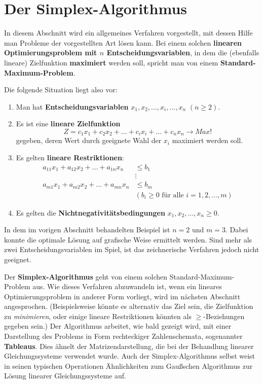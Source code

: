 \section{Der Simplex-Algorithmus}


In diesem Abschnitt wird ein allgemeines Verfahren vorgestellt, mit dessen Hilfe man Probleme der vorgestellten Art lösen kann. Bei einem solchen \textbf{linearen Optimierungsproblem mit $n$ Entscheidungsvariablen}, in dem die (ebenfalls lineare) Zielfunktion \textbf{maximiert} werden soll, spricht man von einem \textbf{Standard-Maximum-Problem}.

Die folgende Situation liegt also vor:
\begin{enumerate}[label=\Roman*)]
  \item Man hat \textbf{Entscheidungsvariablen} $x_1, x_2, \ldots, x_i, \ldots, x_n$ $(n \geq 2)$.
  \item Es ist eine \textbf{lineare Zielfunktion}
    \[ Z = c_1 x_1 + c_2 x_2 + \ldots + c_i x_i + \ldots + c_n x_n \rightarrow Max! \]
    gegeben, deren Wert durch geeignete Wahl der $x_i$ maximiert werden soll.
  \item Es gelten \textbf{lineare Restriktionen}:
    \begin{align*}
      a_{11} x_1 + a_{12} x_2 + \ldots + a_{1n} x_n &\leq b_1\\
      &\vdots\\
      a_{m1} x_1 + a_{m2} x_2 + \ldots + a_{mn} x_n &\leq b_m\\
      & (b_i \geq 0 \text{ für alle } i = 1,2,\ldots,m)
    \end{align*}
  \item Es gelten die \textbf{Nichtnegativitätsbedingungen} $x_1, x_2, \ldots, x_n \geq 0$.
\end{enumerate}

In dem im vorigen Abschnitt behandelten Beispiel ist $n = 2$ und $m = 3$. Dabei konnte die optimale Lösung auf grafische Weise ermittelt werden. Sind mehr als zwei Entscheidungsvariablen im Spiel, ist das zeichnerische Verfahren jedoch nicht geeignet.

Der \textbf{Simplex-Algorithmus} geht von einem solchen Standard-Maximum-Problem aus. Wie dieses Verfahren abzuwandeln ist, wenn ein lineares Optimierungsproblem in anderer Form vorliegt, wird im nächsten Abschnitt angesprochen. (Beispielsweise könnte es alternativ das Ziel sein, die Zielfunktion zu \emph{minimieren}, oder einige lineare Restriktionen könnten als $\geq$-Beziehungen gegeben sein.) Der Algorithmus arbeitet, wie bald gezeigt wird, mit einer Darstellung des Problems in Form rechteckiger Zahlenschemata, sogenannter \textbf{Tableaus}. Dies ähnelt der Matrizendarstellung, die bei der Behandlung linearer Gleichungssysteme verwendet wurde. Auch der Simplex-Algorithmus selbst weist in seinen typischen Operationen Ähnlichkeiten zum Gaußschen Algorithmus zur Lösung linearer Gleichungssysteme auf.

